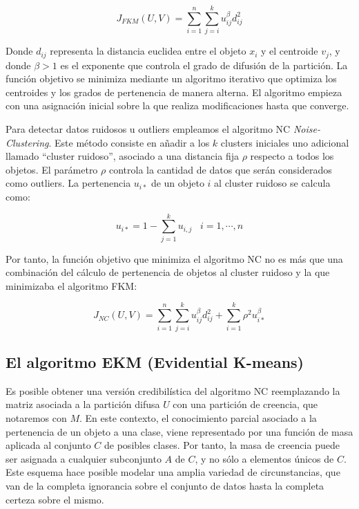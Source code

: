 \begin{equation}
J_{FKM}(U,V) = \sum_{i=1}^{n}\sum_{j=i}^{k} u_{ij}^\beta d_{ij}^2
\label{eqn8}
\end{equation}

Donde $d_{ij}$ representa la distancia euclidea entre el objeto $x_i$ y el centroide $v_j$, y donde $\beta > 1$ es el exponente que controla el grado de difusión de la partición. La función objetivo se minimiza mediante un algoritmo iterativo que optimiza los centroides y los grados de pertenencia de manera alterna. El algoritmo empieza con una asignación inicial sobre la que realiza modificaciones hasta que converge.

Para detectar datos ruidosos u outliers empleamos el algoritmo \acs{NC} \textit{Noise-Clustering}. Este método consiste en añadir a los $k$ clusters iniciales uno adicional llamado ``cluster ruidoso'', asociado a una distancia fija $\rho$ respecto a todos los objetos. El parámetro $\rho$ controla la cantidad de datos que serán considerados como outliers. La pertenencia $u_{i*}$ de un objeto $i$ al cluster ruidoso se calcula como:

\begin{equation}
u_{i*} = 1 - \sum_{j=1}^{k} u_{i,j} \;\;\; i = {1,\cdots,n}
\label{eqn9}
\end{equation}

Por tanto, la función objetivo que minimiza el algoritmo \acs{NC} no es más que una combinación del cálculo de pertenencia de objetos al cluster ruidoso y la que minimizaba el algoritmo \acs{FKM}:

\begin{equation}
J_{NC}(U,V) = \sum_{i=1}^{n}\sum_{j=i}^{k} u_{ij}^\beta d_{ij}^2 + \sum_{i=1}^{k} \rho^2 u_{i*}^\beta
\label{eqn10}
\end{equation}

\subsection{El algoritmo EKM (Evidential K-means)}

Es posible obtener una versión credibilística del algoritmo \acs{NC} reemplazando la matriz asociada a la partición difusa $U$ con una partición de creencia, que notaremos con $M$. En este contexto, el conocimiento parcial asociado a la pertenencia de un objeto a una clase, viene representado por una función de masa aplicada al conjunto $C$ de posibles clases. Por tanto, la masa de creencia puede ser asignada a cualquier subconjunto $A$ de $C$, y no sólo a elementos únicos de $C$. Este esquema hace posible modelar una amplia variedad de circunstancias, que van de la completa ignorancia sobre el conjunto de datos hasta la completa certeza sobre el mismo.

